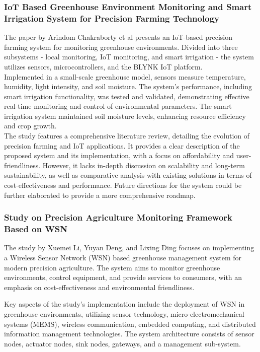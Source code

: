 \documentclass[12pt, a4paper]{article}
\begin{document}
\subsubsection{IoT Based Greenhouse Environment Monitoring and Smart Irrigation System for Precision Farming Technology}
The paper by Arindom Chakraborty et al\cite{chakraborty2022iot} presents an IoT-based precision farming system for monitoring greenhouse environments. Divided into three subsystems - local monitoring, IoT monitoring, and smart irrigation - the system utilizes sensors, microcontrollers, and the BLYNK IoT platform.\\
Implemented in a small-scale greenhouse model, sensors measure temperature, humidity, light intensity, and soil moisture. The system's performance, including smart irrigation functionality, was tested and validated, demonstrating effective real-time monitoring and control of environmental parameters. The smart irrigation system maintained soil moisture levels, enhancing resource efficiency and crop growth.\\
The study features a comprehensive literature review, detailing the evolution of precision farming and IoT applications. It provides a clear description of the proposed system and its implementation, with a focus on affordability and user-friendliness. However, it lacks in-depth discussion on scalability and long-term sustainability, as well as comparative analysis with existing solutions in terms of cost-effectiveness and performance. Future directions for the system could be further elaborated to provide a more comprehensive roadmap.

\subsubsection{Study on Precision Agriculture Monitoring Framework Based on WSN}
The study by Xuemei Li, Yuyan Deng, and Lixing Ding\cite{li2008study} focuses on implementing a Wireless Sensor Network (WSN) based greenhouse management system for modern precision agriculture. The system aims to monitor greenhouse environments, control equipment, and provide services to consumers, with an emphasis on cost-effectiveness and environmental friendliness.

Key aspects of the study's implementation include the deployment of WSN in greenhouse environments, utilizing sensor technology, micro-electromechanical systems (MEMS), wireless communication, embedded computing, and distributed information management technologies. The system architecture consists of sensor nodes, actuator nodes, sink nodes, gateways, and a management sub-system.
\end{document}
